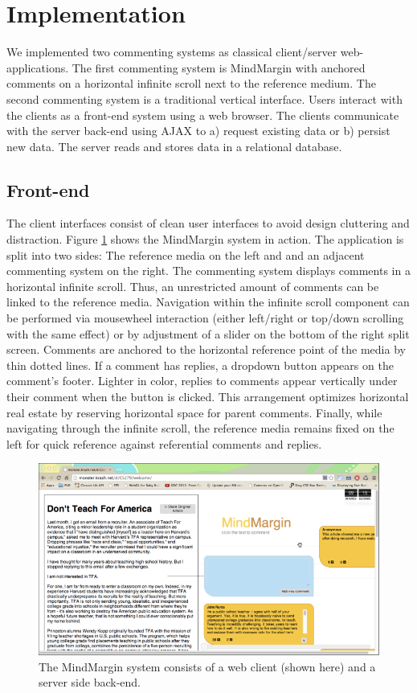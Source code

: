 \section {Implementation}

We implemented two commenting systems as classical client/server web-applications. The first commenting system is MindMargin with anchored comments on a horizontal infinite scroll next to the reference medium. The second commenting system is a traditional vertical interface. Users interact with the clients as a front-end system using a web browser. The clients communicate with the server back-end using AJAX to a) request existing data or b) persist new data. The server reads and stores data in a relational database.

\subsection{Front-end}
The client interfaces consist of clean user interfaces to avoid design cluttering and distraction. Figure \ref{fig:frontend} shows the MindMargin system in action. The application is split into two sides: The reference media on the left and and an adjacent commenting system on the right. The commenting system displays comments in a horizontal infinite scroll. Thus, an unrestricted amount of comments can be linked to the reference media. Navigation within the infinite scroll component can be performed via mousewheel interaction (either left/right or top/down scrolling with the same effect) or by adjustment of a slider on the bottom of the right split screen. Comments are anchored to the horizontal reference point of the media by thin dotted lines. If a comment has replies, a dropdown button appears on the comment's footer. Lighter in color, replies to comments appear vertically under their comment when the button is clicked. This arrangement optimizes horizontal real estate by reserving horizontal space for parent comments. Finally, while navigating through the infinite scroll, the reference media remains fixed on the left for quick reference against referential comments and replies.

\begin{figure}
\centering
\includegraphics[scale=0.3]{mindmargin.png} 
\caption{The MindMargin system consists of a web client (shown here) and a server side back-end.}
\label{fig:frontend}
\end{figure}

